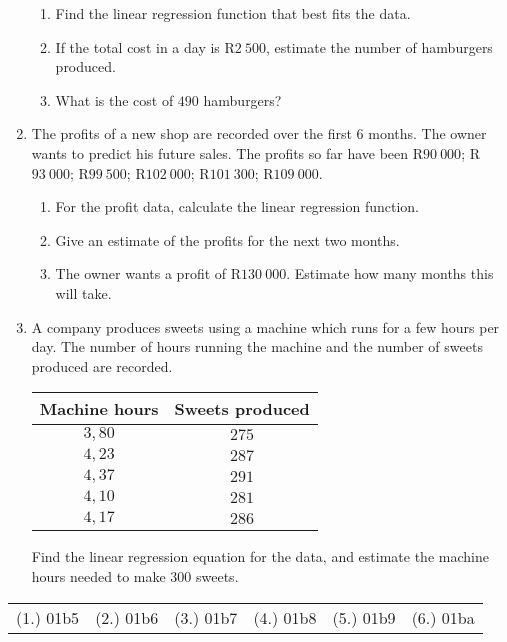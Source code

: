\begin{eocexercises}{}
\begin{enumerate}
\begin{enumerate}
\item Find the linear regression function that best fits the data.

\item If the total cost in a day is R$2~500$, estimate the number of hamburgers produced.

\item What is the cost of $490$ hamburgers?

\end{enumerate}

\item
The profits of a new shop are recorded over the first 6 months. The owner wants to predict his future sales. The profits so far have been R$90~000$; R$93~000$; R$99~500$; R$102~000$; R$101~300$; R$109~000$. 

\begin{enumerate}
\item For the profit data, calculate the linear regression function.

\item Give an estimate of the profits for the next two months.

\item The owner wants a profit of R$130~000$. Estimate how many months this will take.
\end{enumerate}

\item
A company produces sweets using a machine which runs for a few hours per day. The number of hours running the machine and the number of sweets produced are recorded.

\begin{tabular}{|c|c|}
\hline
Machine hours & Sweets produced\\
\hline
$3,80$ & $275$ \\ \hline
$4,23$ & $287$ \\ \hline
$4,37$ & $291$ \\ \hline
$4,10$ & $281$ \\ \hline
$4,17$ & $286$ \\ 
\hline

\hline
\end{tabular}

Find the linear regression equation for the data, and estimate the machine hours needed to make $300$ sweets.


\end{enumerate}





\par \practiceinfo
\par \begin{tabular}[h]{cccccc}
(1.)	01b5	&
(2.)	01b6	&
(3.)	01b7	&
(4.)	01b8	&
(5.)	01b9	&
(6.)	01ba	\\ %
\end{tabular}
\end{eocexercises}

